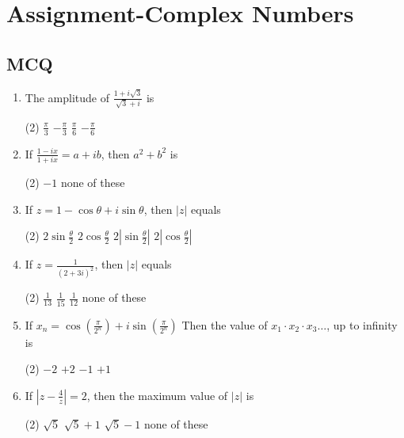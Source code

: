 \chapter{Assignment-Complex Numbers}
\section{MCQ}
\begin{enumerate}
	\item The amplitude of $\frac{1+i \sqrt{3}}{\sqrt{3}+i}$ is
 \begin{tasks}(2)
	\task[\textbf{a.}]$\frac{\pi}{3}$
	\task[\textbf{b.}]$-\frac{\pi}{3}$
	\task[\textbf{c.}]$\frac{\pi}{6}$
	\task[\textbf{d.}]  $-\frac{\pi}{6}$
\end{tasks}	
	\item If $\frac{1-i x}{1+i x}=a+i b$, then $a^{2}+b^{2}$ is
	 \begin{tasks}(2)
		\task[\textbf{b.}]$-1$
		\task[\textbf{d.}] none of these
	\end{tasks}
	\item If $z=1-\cos \theta+i \sin \theta$, then $|z|$ equals
	 \begin{tasks}(2)
		\task[\textbf{a.}]$2 \sin \frac{\theta}{2}$
		\task[\textbf{b.}]$2 \cos \frac{\theta}{2}$
		\task[\textbf{c.}]$2\left|\sin \frac{\theta}{2}\right|$
		\task[\textbf{d.}] $2\left|\cos \frac{\theta}{2}\right|$
	\end{tasks}
	\item If $z=\frac{1}{(2+3 i)^{2}}$, then $|z|$ equals
	 \begin{tasks}(2)
		\task[\textbf{a.}]$\frac{1}{13}$
		\task[\textbf{b.}]$\frac{1}{15}$
		\task[\textbf{c.}]$\frac{1}{12}$
		\task[\textbf{d.}] none of these
	\end{tasks}
	\item If $x_{n}=\cos \left(\frac{\pi}{2^{n}}\right)+i \sin \left(\frac{\pi}{2^{n}}\right)$
	Then the value of $x_{1} \cdot x_{2} \cdot x_{3} \ldots$, up to infinity is
	 \begin{tasks}(2)
		\task[\textbf{a.}] $-2$
		\task[\textbf{b.}] $+2$
		\task[\textbf{c.}] $-1$
		\task[\textbf{d.}] $+1$
	\end{tasks}
	\item If $\left|z-\frac{4}{z}\right|=2$, then the maximum value of $|z|$ is
	 \begin{tasks}(2)
		\task[\textbf{a.}]$\sqrt{5}$
		\task[\textbf{b.}]$\sqrt{5}+1$
		\task[\textbf{c.}]$\sqrt{5}-1$
		\task[\textbf{d.}] none of these

\end{tasks}
\end{enumerate}
